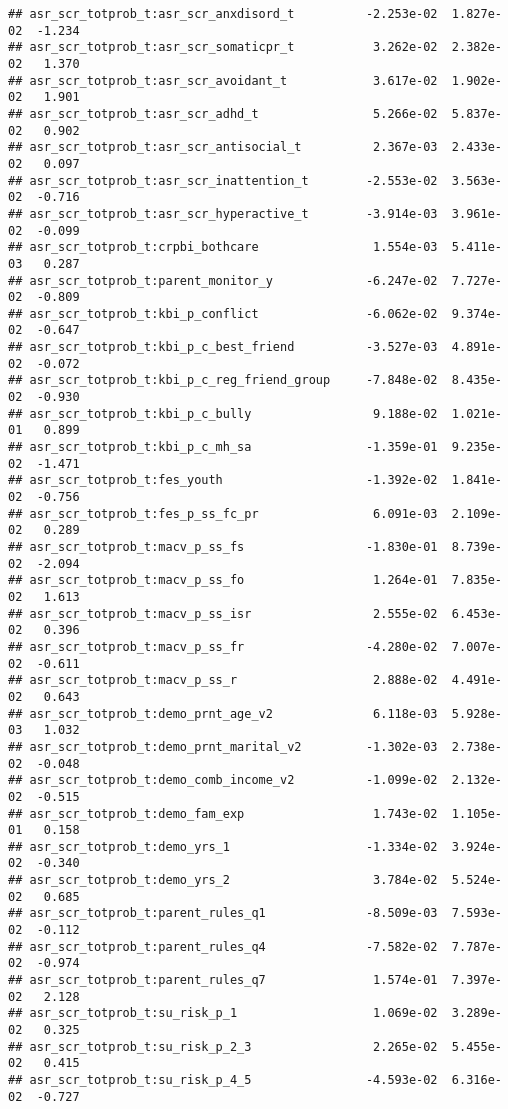 \documentclass[
]{article}
\begin{document}
\begin{verbatim}
## asr_scr_totprob_t:asr_scr_anxdisord_t          -2.253e-02  1.827e-02  -1.234
## asr_scr_totprob_t:asr_scr_somaticpr_t           3.262e-02  2.382e-02   1.370
## asr_scr_totprob_t:asr_scr_avoidant_t            3.617e-02  1.902e-02   1.901
## asr_scr_totprob_t:asr_scr_adhd_t                5.266e-02  5.837e-02   0.902
## asr_scr_totprob_t:asr_scr_antisocial_t          2.367e-03  2.433e-02   0.097
## asr_scr_totprob_t:asr_scr_inattention_t        -2.553e-02  3.563e-02  -0.716
## asr_scr_totprob_t:asr_scr_hyperactive_t        -3.914e-03  3.961e-02  -0.099
## asr_scr_totprob_t:crpbi_bothcare                1.554e-03  5.411e-03   0.287
## asr_scr_totprob_t:parent_monitor_y             -6.247e-02  7.727e-02  -0.809
## asr_scr_totprob_t:kbi_p_conflict               -6.062e-02  9.374e-02  -0.647
## asr_scr_totprob_t:kbi_p_c_best_friend          -3.527e-03  4.891e-02  -0.072
## asr_scr_totprob_t:kbi_p_c_reg_friend_group     -7.848e-02  8.435e-02  -0.930
## asr_scr_totprob_t:kbi_p_c_bully                 9.188e-02  1.021e-01   0.899
## asr_scr_totprob_t:kbi_p_c_mh_sa                -1.359e-01  9.235e-02  -1.471
## asr_scr_totprob_t:fes_youth                    -1.392e-02  1.841e-02  -0.756
## asr_scr_totprob_t:fes_p_ss_fc_pr                6.091e-03  2.109e-02   0.289
## asr_scr_totprob_t:macv_p_ss_fs                 -1.830e-01  8.739e-02  -2.094
## asr_scr_totprob_t:macv_p_ss_fo                  1.264e-01  7.835e-02   1.613
## asr_scr_totprob_t:macv_p_ss_isr                 2.555e-02  6.453e-02   0.396
## asr_scr_totprob_t:macv_p_ss_fr                 -4.280e-02  7.007e-02  -0.611
## asr_scr_totprob_t:macv_p_ss_r                   2.888e-02  4.491e-02   0.643
## asr_scr_totprob_t:demo_prnt_age_v2              6.118e-03  5.928e-03   1.032
## asr_scr_totprob_t:demo_prnt_marital_v2         -1.302e-03  2.738e-02  -0.048
## asr_scr_totprob_t:demo_comb_income_v2          -1.099e-02  2.132e-02  -0.515
## asr_scr_totprob_t:demo_fam_exp                  1.743e-02  1.105e-01   0.158
## asr_scr_totprob_t:demo_yrs_1                   -1.334e-02  3.924e-02  -0.340
## asr_scr_totprob_t:demo_yrs_2                    3.784e-02  5.524e-02   0.685
## asr_scr_totprob_t:parent_rules_q1              -8.509e-03  7.593e-02  -0.112
## asr_scr_totprob_t:parent_rules_q4              -7.582e-02  7.787e-02  -0.974
## asr_scr_totprob_t:parent_rules_q7               1.574e-01  7.397e-02   2.128
## asr_scr_totprob_t:su_risk_p_1                   1.069e-02  3.289e-02   0.325
## asr_scr_totprob_t:su_risk_p_2_3                 2.265e-02  5.455e-02   0.415
## asr_scr_totprob_t:su_risk_p_4_5                -4.593e-02  6.316e-02  -0.727

\end{verbatim}
\end{document}
